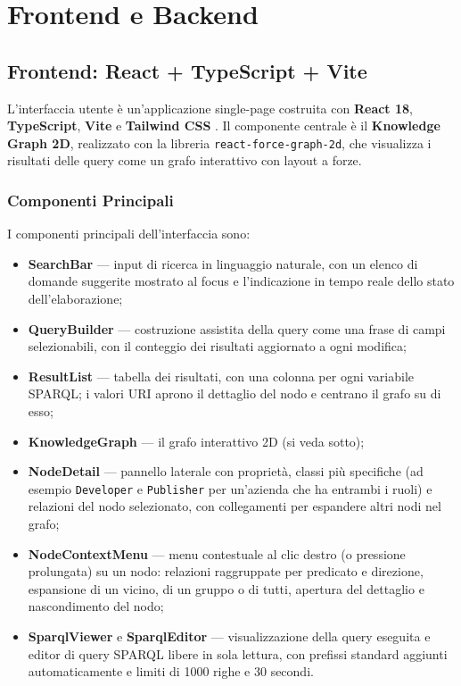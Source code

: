 \section{Frontend e Backend}
\label{sec:frontend_backend}

\subsection{Frontend: React + TypeScript + Vite}

L'interfaccia utente \`e un'applicazione single-page costruita con \textbf{React 18},
\textbf{TypeScript}, \textbf{Vite} e \textbf{Tailwind CSS} \citep{react}. Il
componente centrale \`e il \textbf{Knowledge Graph 2D}, realizzato con la libreria
\texttt{react-force-graph-2d}, che visualizza i risultati delle query come un
grafo interattivo con layout a forze.

\subsubsection{Componenti Principali}

I componenti principali dell'interfaccia sono:

\begin{itemize}[nosep]
  \item \textbf{SearchBar} --- input di ricerca in linguaggio naturale, con un elenco di domande suggerite
    mostrato al focus e l'indicazione in tempo reale dello stato dell'elaborazione;
  \item \textbf{QueryBuilder} --- costruzione assistita della query come una frase di campi selezionabili,
    con il conteggio dei risultati aggiornato a ogni modifica;
  \item \textbf{ResultList} --- tabella dei risultati, con una colonna per ogni variabile SPARQL; i valori
    URI aprono il dettaglio del nodo e centrano il grafo su di esso;
  \item \textbf{KnowledgeGraph} --- il grafo interattivo 2D (si veda sotto);
  \item \textbf{NodeDetail} --- pannello laterale con propriet\`a, classi pi\`u specifiche (ad esempio
    \texttt{Developer} e \texttt{Publisher} per un'azienda che ha entrambi i ruoli) e relazioni del nodo
    selezionato, con collegamenti per espandere altri nodi nel grafo;
  \item \textbf{NodeContextMenu} --- menu contestuale al clic destro (o pressione prolungata) su un nodo:
    relazioni raggruppate per predicato e direzione, espansione di un vicino, di un gruppo o di tutti,
    apertura del dettaglio e nascondimento del nodo;
  \item \textbf{SparqlViewer} e \textbf{SparqlEditor} --- visualizzazione della query eseguita e editor di
    query SPARQL libere in sola lettura, con prefissi standard aggiunti automaticamente e limiti di
    1000 righe e 30 secondi.
\end{itemize}


